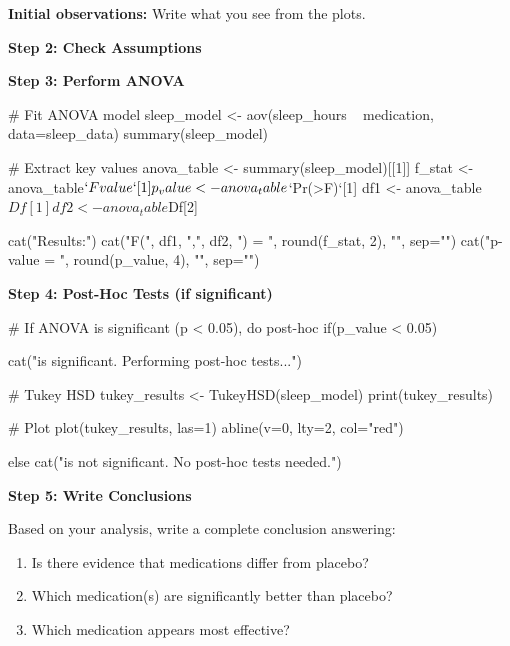\documentclass[11pt]{article}
\begin{document}
\textbf{Initial observations:} Write what you see from the plots.

\vspace{2cm}

\textbf{Step 2: Check Assumptions}


\textbf{Step 3: Perform ANOVA}

\begin{rcode}
# Fit ANOVA model
sleep_model <- aov(sleep_hours ~ medication, data=sleep_data)
summary(sleep_model)

# Extract key values
anova_table <- summary(sleep_model)[[1]]
f_stat <- anova_table$`F value`[1]
p_value <- anova_table$`Pr(>F)`[1]
df1 <- anova_table$Df[1]
df2 <- anova_table$Df[2]

cat("\nANOVA Results:\n")
cat("F(", df1, ",", df2, ") = ", round(f_stat, 2), "\n", sep="")
cat("p-value = ", round(p_value, 4), "\n", sep="")
\end{rcode}

\textbf{Step 4: Post-Hoc Tests (if significant)}

\begin{rcode}
# If ANOVA is significant (p < 0.05), do post-hoc
if(p_value < 0.05) {
  cat("\nANOVA is significant. Performing post-hoc tests...\n\n")

  # Tukey HSD
  tukey_results <- TukeyHSD(sleep_model)
  print(tukey_results)

  # Plot
  plot(tukey_results, las=1)
  abline(v=0, lty=2, col="red")
} else {
  cat("\nANOVA is not significant. No post-hoc tests needed.\n")
}
\end{rcode}

\textbf{Step 5: Write Conclusions}

Based on your analysis, write a complete conclusion answering:
\begin{enumerate}
\item Is there evidence that medications differ from placebo?
\item Which medication(s) are significantly better than placebo?
\item Which medication appears most effective?
\end{enumerate}
\end{document}
